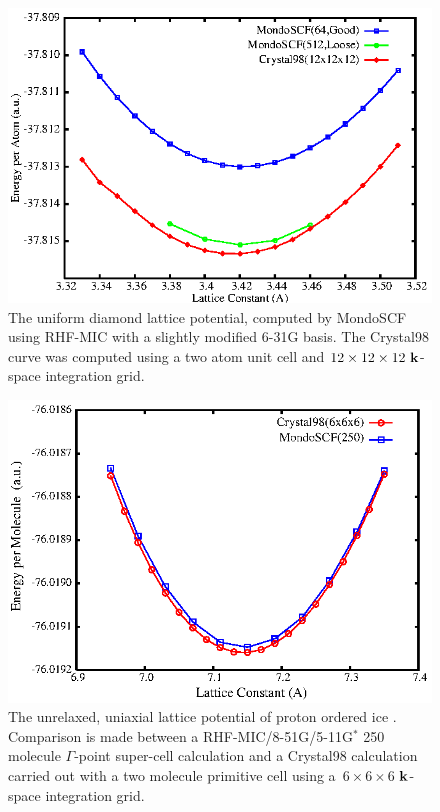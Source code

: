 \documentclass[prb,aps,nobibnotes,twocolumn,doublespace,twocolumngrid,superbib]{revtex4}
\begin{document}
\begin{figure}[h]
\caption{The uniform diamond lattice potential, computed by {\sc MondoSCF} using 
RHF-MIC with a slightly modified 6-31G basis.  The {\sc Crystal98} curve was computed
using a two atom unit cell and $12 \times 12 \times 12~{\bf k}$-space integration grid.}
\label{DiamondLattice}
{\center \includegraphics{Diamond_En_vs_a.ps} \par}
\end{figure}


\begin{figure}
\caption{The unrelaxed, uniaxial lattice potential of proton ordered ice \cite{}.
Comparison is made between a RHF-MIC/8-51G/5-11G$^*$ 250 molecule $\Gamma$-point super-cell 
calculation and a {\sc Crystal98} calculation carried out with a two molecule primitive
cell using a~$6\times6\times6$ ${\bf k}$-space integration grid.}
\label{IceEnergyVsLattice}
{\center \includegraphics{pIce_En_vs_a.ps}\par}
\end{figure}
\end{document}
